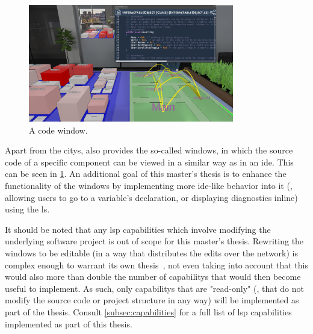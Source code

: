 \documentclass[../thesis]{subfiles}
\begin{document}
\begin{figure}
	\captionsetup{type=figure}
	\centering
	\includegraphics[width=0.8\textwidth,trim={30.5cm 22cm 6cm 0},clip]{../figures/SEE_readme}
	\caption{A code window.}\label{fig:window}
\end{figure}

Apart from the \glspl{city}, \SEE{} also provides the so-called \glspl*{window}, in which the source code of a specific component can be viewed in a similar way as in an \gls{ide}.
This can be seen in \cref{fig:window}.
An additional goal of this master's thesis is to enhance the functionality of the \glspl{window} by implementing more \gls{ide}-like behavior into it (\eg, allowing users to go to a variable's declaration, or displaying diagnostics inline) using the \gls{ls}.

It should be noted that any \gls{lsp} capabilities which involve modifying the underlying software project is out of scope for this master's thesis.
Rewriting the \glspl{window} to be editable (in a way that distributes the edits over the network) is complex enough to warrant its own thesis~\cite[see also][]{moritz}, not even taking into account that this would also more than double the number of \glspl{capability} that would then become useful to implement.
As such, only \glspl{capability} that are "read-only" (\ie, that do not modify the source code or project structure in any way) will be implemented as part of the thesis.
Consult \cref{subsec:capabilities} for a full list of \gls{lsp} capabilities implemented as part of this thesis.
\end{document}
